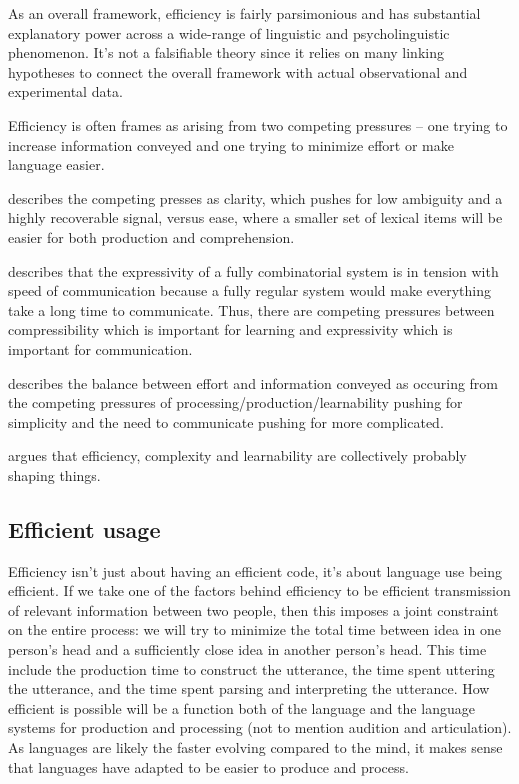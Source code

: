 \documentclass[]{article}
\begin{document}
As an overall framework, efficiency is fairly parsimonious and has substantial explanatory power across a wide-range of linguistic and psycholinguistic phenomenon. It's not a falsifiable theory since it relies on many linking hypotheses to connect the overall framework with actual observational and experimental data. %

Efficiency is often frames as arising from two competing pressures -- one trying to increase information conveyed and one trying to minimize effort or make language easier. 

\cite{piantadosi2012} describes the competing presses as clarity, which pushes for low ambiguity and a highly recoverable signal, versus ease, where a smaller set of lexical items will be easier for both production and comprehension. 

\cite{kirby2015} describes that the expressivity of a fully combinatorial system is in tension with speed of communication because a fully regular system would make everything take a long time to communicate. Thus, there are competing pressures between compressibility which is important for learning and expressivity which is important for communication. %

\cite{???} describes the balance between effort and information conveyed as occuring from the competing pressures of processing/production/learnability pushing for simplicity and the need to communicate pushing for more complicated. 

\cite{gibson2019} argues that efficiency, complexity and learnability are collectively probably shaping things. %

\subsection{Efficient usage}
Efficiency isn't just about having an efficient code, it's about language use being efficient. If we take one of the factors behind efficiency to be efficient transmission of relevant information between two people, then this imposes a joint constraint on the entire process: we will try to minimize the total time between idea in one person's head and a sufficiently close idea in another person's head. This time include the production time to construct the utterance, the time spent uttering the utterance, and the time spent parsing and interpreting the utterance. How efficient is possible will be a function both of the language and the language systems for production and processing (not to mention audition and articulation). As languages are likely the faster evolving compared to the mind, it makes sense that languages have adapted to be easier to produce and process. 
\end{document}
